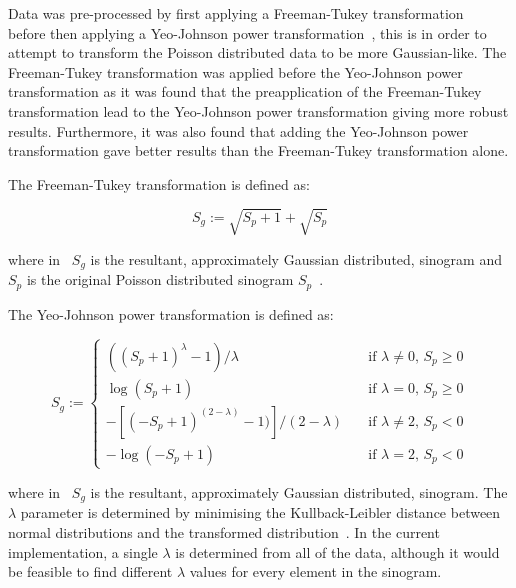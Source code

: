         Data was pre-processed by first applying a Freeman-Tukey transformation~\cite{Freeman1950TransformationsRoot} before then applying a Yeo-Johnson power transformation~\cite{Yeo2000ASymmetry}, this is in order to attempt to transform the Poisson distributed data to be more Gaussian-like. The Freeman-Tukey transformation was applied before the Yeo-Johnson power transformation as it was found that the preapplication of the Freeman-Tukey transformation lead to the Yeo-Johnson power transformation giving more robust results. Furthermore, it was also found that adding the Yeo-Johnson power transformation gave better results than the Freeman-Tukey transformation alone.
        
        The Freeman-Tukey transformation is defined as:
        
        \begin{equation} \label{eq:freeman_tukey}
            S_g := \sqrt{S_p + 1} + \sqrt{S_p}
        \end{equation}
        
        \noindent where in~ $S_g$ is the resultant, approximately Gaussian distributed, sinogram and $S_p$ is the original Poisson distributed sinogram $S_p$~\cite{Freeman1950TransformationsRoot}.
        
        The Yeo-Johnson power transformation is defined as:
        
        \begin{equation} \label{eq:yeo_johnson}
            S_g := \begin{cases}
                        ((S_p + 1)^\lambda - 1) / \lambda                   & \quad \text{if } \lambda \neq 0 \text{, } S_p \geq 0 \\
                        \log(S_p + 1)                                       & \quad \text{if } \lambda = 0 \text{, } S_p \geq 0    \\
                        -[(-S_p + 1)^{(2 - \lambda)} - 1)] / (2 - \lambda)  & \quad \text{if } \lambda \neq 2 \text{, } S_p < 0    \\
                        -\log(-S_p + 1)                                     & \quad \text{if } \lambda = 2 \text{, } S_p < 0
                    \end{cases}
        \end{equation}
        
        \noindent where in~ $S_g$ is the resultant, approximately Gaussian distributed, sinogram. The $\lambda$ parameter is determined by minimising the Kullback-Leibler distance between normal distributions and the transformed distribution~\cite{Yeo2000ASymmetry}. In the current implementation, a single $\lambda$ is determined from all of the data, although it would be feasible to find different $\lambda$ values for every element in the sinogram.
        
